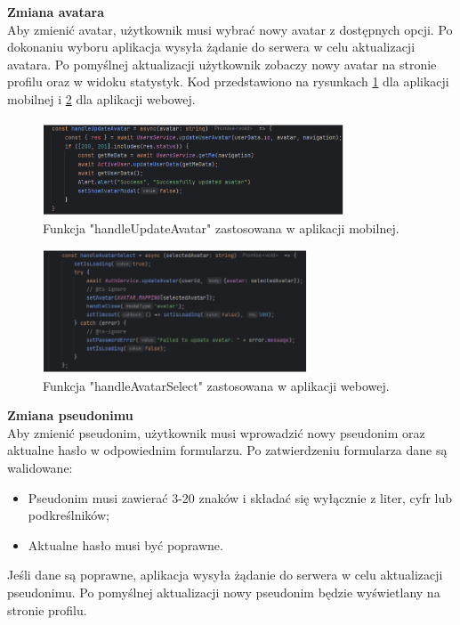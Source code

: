 \textbf{Zmiana avatara}\\
Aby zmienić avatar, użytkownik musi wybrać nowy avatar z dostępnych opcji. Po dokonaniu wyboru aplikacja wysyła żądanie do serwera w celu aktualizacji avatara. Po pomyślnej aktualizacji użytkownik zobaczy nowy avatar na stronie profilu oraz w widoku statystyk. Kod przedstawiono na rysunkach \ref{img:edit_user_mobile} dla aplikacji mobilnej i \ref{img:edit_user_web} dla aplikacji webowej.

\begin{figure}[H]
    \centering
    \includegraphics[width=0.8\textwidth]{chapters/chapter_8/screens/edit_user_mobile}
    \caption{Funkcja "handleUpdateAvatar" zastosowana w aplikacji mobilnej.}
    \label{img:edit_user_mobile}
\end{figure}

\begin{figure}[H]
    \centering
    \includegraphics[width=0.7\textwidth]{chapters/chapter_8/screens/edit_user_web}
    \caption{Funkcja "handleAvatarSelect" zastosowana w aplikacji webowej.}
    \label{img:edit_user_web}
\end{figure}

\textbf{Zmiana pseudonimu}\\
Aby zmienić pseudonim, użytkownik musi wprowadzić nowy pseudonim oraz aktualne hasło w odpowiednim formularzu. Po zatwierdzeniu formularza dane są walidowane:
\begin{itemize}
    \item Pseudonim musi zawierać 3-20 znaków i składać się wyłącznie z liter, cyfr lub podkreślników;
    \item Aktualne hasło musi być poprawne.
\end{itemize}
Jeśli dane są poprawne, aplikacja wysyła żądanie do serwera w celu aktualizacji pseudonimu. Po pomyślnej aktualizacji nowy pseudonim będzie wyświetlany na stronie profilu.\\


